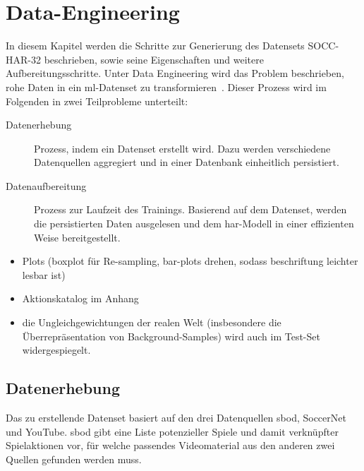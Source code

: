 \chapter{Data-Engineering}
\label{ch:data}

\newcommand{\noaction}{37521\ }
\newcommand{\novideos}{194\ }
\newcommand{\nomatches}{152\ }

In diesem Kapitel werden die Schritte zur Generierung des Datensets SOCC-HAR-32 beschrieben, sowie seine Eigenschaften und weitere Aufbereitungsschritte.
Unter Data Engineering wird das Problem beschrieben, rohe Daten in ein \gls{ml}-Datenset zu transformieren~\cite{Burkov19}.
Dieser Prozess wird im Folgenden in zwei Teilprobleme unterteilt:
\begin{description}
    \item[Datenerhebung] Prozess, indem ein Datenset erstellt wird.
        Dazu werden verschiedene Datenquellen aggregiert und in einer Datenbank einheitlich persistiert.
    \item[Datenaufbereitung] Prozess zur Laufzeit des Trainings.
        Basierend auf dem Datenset, werden die persistierten Daten ausgelesen und dem \gls{har}-Modell in einer effizienten Weise bereitgestellt.
\end{description}

\begin{tcolorbox}[title=WIP]
    \begin{itemize}
        \item Plots (boxplot für Re-sampling, bar-plots drehen, sodass beschriftung leichter lesbar ist)
        \item Aktionskatalog im Anhang
        \item \Dh die Ungleichgewichtungen der realen Welt (insbesondere die Überrepräsentation von Background-Samples) wird auch im Test-Set widergespiegelt.
    \end{itemize}
\end{tcolorbox}


\section{Datenerhebung}
\label{sec:datenerhebung}

Das zu erstellende Datenset basiert auf den drei Datenquellen \gls{sbod}, SoccerNet und YouTube.
\gls{sbod} gibt eine Liste potenzieller Spiele und damit verknüpfter Spielaktionen vor, für welche passendes Videomaterial aus den anderen zwei Quellen gefunden werden muss.


